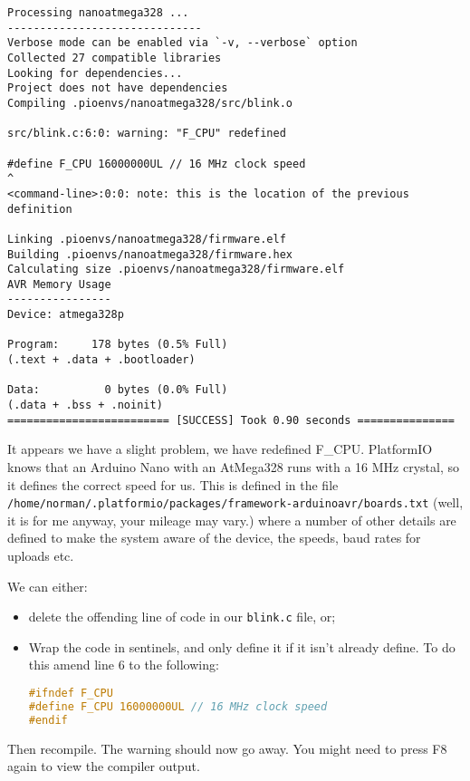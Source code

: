 \begin{lstlisting}
Processing nanoatmega328 ...
------------------------------
Verbose mode can be enabled via `-v, --verbose` option
Collected 27 compatible libraries
Looking for dependencies...
Project does not have dependencies
Compiling .pioenvs/nanoatmega328/src/blink.o

src/blink.c:6:0: warning: "F_CPU" redefined

#define F_CPU 16000000UL // 16 MHz clock speed
^
<command-line>:0:0: note: this is the location of the previous 
definition

Linking .pioenvs/nanoatmega328/firmware.elf
Building .pioenvs/nanoatmega328/firmware.hex
Calculating size .pioenvs/nanoatmega328/firmware.elf
AVR Memory Usage
----------------
Device: atmega328p

Program:     178 bytes (0.5% Full)
(.text + .data + .bootloader)

Data:          0 bytes (0.0% Full)
(.data + .bss + .noinit)
========================= [SUCCESS] Took 0.90 seconds ===============
\end{lstlisting}

It appears we have a slight problem, we have redefined F\_CPU.
PlatformIO knows that an Arduino Nano with an AtMega328 runs with a 16
MHz crystal, so it defines the correct speed for us. This is defined in the file
\lstinline!/home/norman/.platformio/packages/framework-arduinoavr/boards.txt! (well, it
is for me anyway, your mileage may vary.) where a number of other details are defined
to make the system aware of the device, the speeds, baud rates for uploads etc.

We can either:

\begin{itemize}
\item
  delete the offending line of code in our \lstinline!blink.c! file, or;
\item
  Wrap the code in sentinels, and only define it if it isn't already
  define. To do this amend line 6 to the following:

\begin{lstlisting}[language=C,firstnumber=6,caption={Fixing F\_CPU warning in AVRBlick.c}]
#ifndef F_CPU
#define F_CPU 16000000UL // 16 MHz clock speed
#endif
\end{lstlisting}
\end{itemize}

Then recompile. The warning should now go away. You might need to press
F8 again to view the compiler output.

